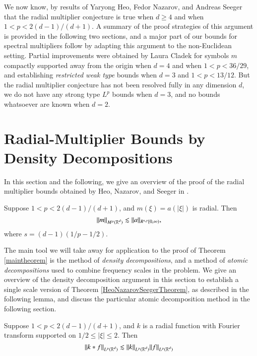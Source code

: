 We now know, by results of Yaryong Heo, Fedor Nazarov, and Andreas Seeger \cite{HeoandNazarovandSeeger} that the radial multiplier conjecture is true when $d \geq 4$ and when $1 < p < 2(d-1)/(d+1)$. A summary of the proof strategies of this argument is provided in the following two sections, and a major part of our bounds for spectral multipliers follow by adapting this argument to the non-Euclidean setting. Partial improvements were obtained by Laura Cladek \cite{Cladek} for symbols $m$ compactly supported away from the origin when $d = 4$ and when $1 < p < 36/29$, and establishing \emph{restricted weak type} bounds when $d = 3$ and $1 < p < 13/12$. But the radial multiplier conjecture has not been resolved fully in any dimension $d$, we do not have any strong type $L^p$ bounds when $d = 3$, and no bounds whatsoever are known when $d = 2$.
% 
\section{Radial-Multiplier Bounds by Density Decompositions} \label{sec:densitydecompositions}

In this section and the following, we give an overview of the proof of the radial multiplier bounds obtained by Heo, Nazarov, and Seeger in \cite{HeoandNazarovandSeeger}.

\begin{theorem} \label{HeoNazarovSeegerTheorem}
    Suppose $1 < p < 2(d-1)/(d+1)$, and $m(\xi) = a(|\xi|)$ is radial. Then
    \[ \| m \|_{M^p(\operatorname{\mathbb{R}}^d)} \lesssim \| a \|_{R^{s,p}[0,\infty)}, \]
    where $s = (d-1)(1/p - 1/2)$.
\end{theorem}

The main tool we will take away for application to the proof of Theorem \ref{maintheorem} is the method of \emph{density decompositions}, and a method of \emph{atomic decompositions} used to combine frequency scales in the problem. We give an overview of the density decomposition argument in this section to establish a single scale version of Theorem \ref{HeoNazarovSeegerTheorem}, as described in the following lemma, and discuss the particular atomic decomposition method in the following section.

\begin{prop} \label{HeoNazarovSeegerSingleScaleInequality}
  Suppose $1 < p < 2(d-1)/(d+1)$, and $k$ is a radial function with Fourier transform supported on $1/2 \leq |\xi| \leq 2$. Then
%
\[ \| k * f \|_{L^p(\operatorname{\mathbb{R}}^d)} \lesssim \| k \|_{L^p(\operatorname{\mathbb{R}}^d)} \| f \|_{L^p(\operatorname{\mathbb{R}}^d)} \]
%
\end{prop}

